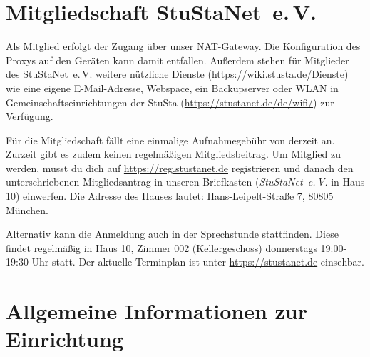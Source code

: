 \documentclass[a4paper,12pt]{scrartcl}
\makeatletter
\newcommand{\StuStaNet}{StuStaNet~e.\,V.\@}
\makeatother
\begin{document}
\section{Mitgliedschaft \StuStaNet{}}
Als Mitglied erfolgt der Zugang über unser NAT-Gateway.
Die Konfiguration des Proxys auf den Geräten kann damit entfallen.
Außerdem stehen für Mitglieder des \StuStaNet{} weitere nützliche Dienste (\url{https://wiki.stusta.de/Dienste}) wie eine eigene E-Mail-Adresse, Webspace, ein Backupserver oder WLAN in Gemeinschaftseinrichtungen der StuSta (\url{https://stustanet.de/de/wifi/}) zur Verfügung. 

Für die Mitgliedschaft fällt eine einmalige Aufnahmegebühr von derzeit  an.
Zurzeit gibt es zudem keinen regelmäßigen Mitgliedsbeitrag.
Um Mitglied zu werden, musst du dich auf \mbox{\url{https://reg.stustanet.de}} registrieren und danach den unterschriebenen Mitgliedsantrag in unseren Briefkasten (\textit{\StuStaNet{}} in Haus 10) einwerfen.
Die Adresse des Hauses lautet: Hans-Leipelt-Straße 7, 80805 München.

Alternativ kann die Anmeldung auch in der Sprechstunde stattfinden.
Diese findet regelmäßig in Haus 10, Zimmer 002 (Kellergeschoss) donnerstags 19:00-19:30 Uhr statt.
Der aktuelle Terminplan ist unter \mbox{\url{https://stustanet.de}} einsehbar.

\section{Allgemeine Informationen zur Einrichtung}
\end{document}
